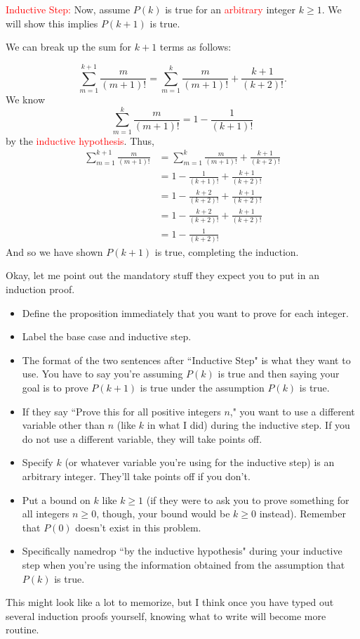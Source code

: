 \documentclass[11pt]{scrartcl}
\begin{document}
\noindent
\textcolor{red}{Inductive Step:} Now, assume $P(k)$ is true for an \textcolor{red}{arbitrary} integer $k \geq 1$. We will show this implies $P(k+1)$ is true.

We can break up the sum for $k+1$ terms as follows:

\[\sum_{m=1}^{k+1}\frac{m}{(m+1)!} = \sum_{m=1}^{k}\frac{m}{(m+1)!} + \frac{k+1}{(k+2)!}.\] We know \[\sum_{m=1}^{k}\frac{m}{(m+1)!} = 1 - \frac{1}{(k+1)!}\] by the \textcolor{red}{inductive hypothesis}. Thus,
\begin{align*}
\sum_{m=1}^{k+1}\frac{m}{(m+1)!} &= \sum_{m=1}^{k}\frac{m}{(m+1)!} + \frac{k+1}{(k+2)!} \\
&= 1 - \frac{1}{(k+1)!} + \frac{k+1}{(k+2)!} \\
&= 1 - \frac{k+2}{(k+2)!} + \frac{k+1}{(k+2)!} \\
&= 1 - \frac{k+2}{(k+2)!} + \frac{k+1}{(k+2)!} \\
&= 1 - \frac{1}{(k+2)!}
\end{align*}
And so we have shown $P(k+1)$ is true, completing the induction.

Okay, let me point out the mandatory stuff they expect you to put in an induction proof.
\begin{itemize}
    \item Define the proposition immediately that you want to prove for each integer.
    \item Label the base case and inductive step.
    \item The format of the two sentences after ``Inductive Step" is what they want to use. You have to say you're assuming $P(k)$ is true and then saying your goal is to prove $P(k+1)$ is true under the assumption $P(k)$ is true.
    \item If they say ``Prove this for all positive integers $n$," you want to use a different variable other than $n$ (like $k$ in what I did) during the inductive step. If you do not use a different variable, they will take points off.
    \item Specify $k$ (or whatever variable you're using for the inductive step) is an arbitrary integer. They'll take points off if you don't.
    \item Put a bound on $k$ like $k \geq 1$ (if they were to ask you to prove something for all integers $n \geq 0$, though, your bound would be $k \geq 0$ instead). Remember that $P(0)$ doesn't exist in this problem.
    \item Specifically namedrop ``by the inductive hypothesis" during your inductive step when you're using the information obtained from the assumption that $P(k)$ is true.
\end{itemize}
This might look like a lot to memorize, but I think once you have typed out several induction proofs yourself, knowing what to write will become more routine.
\end{document}
